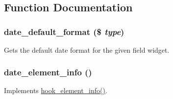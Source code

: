 \subsection{Function Documentation}
\hypertarget{date_8module_a02c7a9a9c79c730064240ea129f062fc}{
\subsubsection[{date\_\-default\_\-format}]{\setlength{\rightskip}{0pt plus 5cm}date\_\-default\_\-format (\$ {\em type})}}
\label{date_8module_a02c7a9a9c79c730064240ea129f062fc}
Gets the default date format for the given field widget. \hypertarget{date_8module_a9e7c70efb10524fbd6c19512b08e697b}{
\subsubsection[{date\_\-element\_\-info}]{\setlength{\rightskip}{0pt plus 5cm}date\_\-element\_\-info ()}}
\label{date_8module_a9e7c70efb10524fbd6c19512b08e697b}
Implements \hyperlink{group__hooks_ga3c5182432eddc82f8b7845e66a365d51}{hook\_\-element\_\-info()}.

